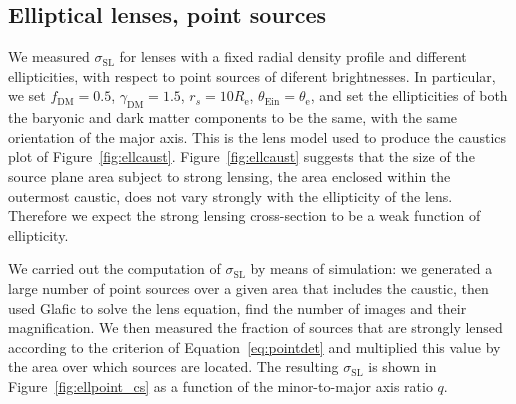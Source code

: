 \documentclass{aa}
\def\reff{R_{\mathrm{e}}}
\def\gammadm{\gamma_{\mathrm{DM}}}
\def\fdm{f_{\mathrm{DM}}}
\def\tein{\theta_{\mathrm{Ein}}}
\def\teff{\theta_{\mathrm{e}}}
\def\crosssect{\sigma_\mathrm{{SL}}}
\def\Fref#1{Figure~\ref{#1}\xspace}
\def\Eref#1{Equation~\ref{#1}\xspace}
\begin{document}
\subsection{Elliptical lenses, point sources}\label{ssec:ellpoint}

We measured $\crosssect$ for lenses with a fixed radial density profile and different ellipticities, with respect to point sources of diferent brightnesses.
In particular, we set $\fdm=0.5$, $\gammadm=1.5$, $r_s=10\reff$, $\tein=\teff$, and set the ellipticities of both the baryonic and dark matter components to be the same, with the same orientation of the major axis.
This is the lens model used to produce the caustics plot of \Fref{fig:ellcaust}.
\Fref{fig:ellcaust} suggests that the size of the source plane area subject to strong lensing, the area enclosed within the outermost caustic, does not vary strongly with the ellipticity of the lens.
Therefore we expect the strong lensing cross-section to be a weak function of ellipticity.

We carried out the computation of $\crosssect$ by means of simulation: we generated a large number of point sources over a given area that includes the caustic, then used {\sc Glafic} to solve the lens equation, find the number of images and their magnification. We then measured the fraction of sources that are strongly lensed according to the criterion of \Eref{eq:pointdet} and multiplied this value by the area over which sources are located.
The resulting $\crosssect$ is shown in \Fref{fig:ellpoint_cs} as a function of the minor-to-major axis ratio $q$.
\end{document}

